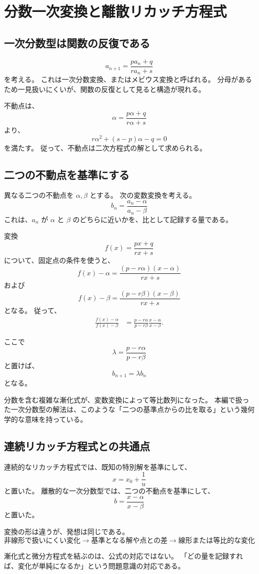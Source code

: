 
\section{分数一次変換と離散リカッチ方程式}

\subsection{一次分数型は関数の反復である}

\[
  a_{n+1}=\frac{pa_n+q}{ra_n+s}
\]
を考える。
これは一次分数変換、またはメビウス変換と呼ばれる。
分母があるため一見扱いにくいが、関数の反復として見ると構造が現れる。

不動点は、
\[
  \alpha=\frac{p\alpha+q}{r\alpha+s}
\]
より、
\[
  r\alpha^2+(s-p)\alpha-q=0
\]
を満たす。
従って、不動点は二次方程式の解として求められる。

\subsection{二つの不動点を基準にする}

異なる二つの不動点を $\alpha,\beta$ とする。
次の変数変換を考える。
\[
  b_n=\frac{a_n-\alpha}{a_n-\beta}
\]
これは、$a_n$ が $\alpha$ と $\beta$ のどちらに近いかを、比として記録する量である。

変換
\[
  f(x)=\frac{px+q}{rx+s}
\]
について、固定点の条件を使うと、
\[
  f(x)-\alpha
  =
  \frac{(p-r\alpha)(x-\alpha)}{rx+s}
\]
および
\[
  f(x)-\beta
  =
  \frac{(p-r\beta)(x-\beta)}{rx+s}
\]
となる。
従って、
\[
  \begin{aligned}
    \frac{f(x)-\alpha}{f(x)-\beta}
     & =
    \frac{p-r\alpha}{p-r\beta}
    \frac{x-\alpha}{x-\beta}.
  \end{aligned}
\]

ここで
\[
  \lambda=\frac{p-r\alpha}{p-r\beta}
\]
と置けば、
\[
  b_{n+1}=\lambda b_n
\]
となる。

分数を含む複雑な漸化式が、変数変換によって等比数列になった。
本編で扱った一次分数型の解法は、このような「二つの基準点からの比を取る」という幾何学的な意味を持っている。

\subsection{連続リカッチ方程式との共通点}

連続的なリカッチ方程式では、既知の特別解を基準にして、
\[
  x=x_0+\frac1u
\]
と置いた。
離散的な一次分数型では、二つの不動点を基準にして、
\[
  b=\frac{x-\alpha}{x-\beta}
\]
と置いた。

変換の形は違うが、発想は同じである。
\[
  \text{非線形で扱いにくい変化}
  \longrightarrow
  \text{基準となる解や点との差}
  \longrightarrow
  \text{線形または等比的な変化}
\]

漸化式と微分方程式を結ぶのは、公式の対応ではない。
「どの量を記録すれば、変化が単純になるか」という問題意識の対応である。
